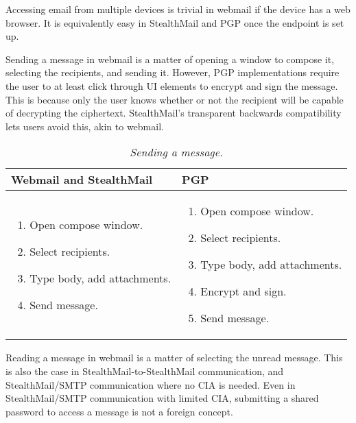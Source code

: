 Accessing email from multiple devices is trivial in webmail if the device has a web browser.  It is equivalently easy in StealthMail and PGP once the endpoint is set up.

Sending a message in webmail is a matter of opening a window to compose it, selecting the recipients, and sending it.  However, PGP implementations require the user to at least click through UI elements to encrypt and sign the message.  This is because only the user knows whether or not the recipient will be capable of decrypting the ciphertext.  StealthMail's transparent backwards compatibility lets users avoid this, akin to webmail.

\begin{table}[ht!]
\begin{tabular}{ | L{3.5cm} | L{3.5cm} |}
\hline
\textbf{Webmail and StealthMail} & \textbf{PGP} \\
\hline
\vspace{-3mm}
\begin{enumerate}
  \item{Open compose window.}
  \item{Select recipients.} 
  \item{Type body, add attachments.}
  \item{Send message.}
\end{enumerate} 
\vspace{-\topsep} &

\vspace{-3mm}
\begin{enumerate}
  \item{Open compose window.}
  \item{Select recipients.}
  \item{Type body, add attachments.}
  \item{Encrypt and sign.}
  \item{Send message.}
\end{enumerate} 
\vspace{-\topsep} \\

\hline
\end{tabular}
\caption{\it Sending a message.}
\label{tab:account-creation}
\end{table}


Reading a message in webmail is a matter of selecting the unread message.  This is also the case in StealthMail-to-StealthMail communication, and StealthMail/SMTP communication where no CIA is needed.  Even in StealthMail/SMTP communication with limited CIA, submitting a shared password to access a message is not a foreign concept.

